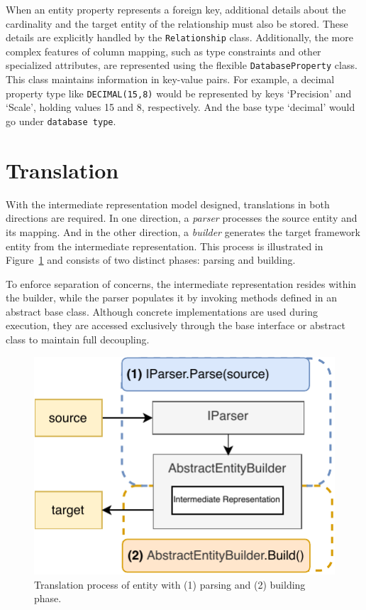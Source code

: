 When an entity property represents a foreign key, additional details about the cardinality and the target entity of the relationship must also be stored. These details are explicitly handled by the \texttt{Relationship} class. Additionally, the more complex features of column mapping, such as type constraints and other specialized attributes, are represented using the flexible \texttt{DatabaseProperty} class. This class maintains information in key-value pairs. For example, a decimal property type like \texttt{DECIMAL(15,8)} would be represented by  keys `Precision' and `Scale', holding values 15 and 8, respectively. And the base type `decimal' would go under \texttt{database type}. 



\section{Translation}

With the intermediate representation model designed, translations in both directions are required. In one direction, a \textit{parser} processes the source entity and its mapping. And in the other direction, a \textit{builder} generates the target framework entity from the intermediate representation. This process is illustrated in Figure~\ref{fig:translation_process} and consists of two distinct phases: parsing and building.

To enforce separation of concerns, the intermediate representation resides within the builder, while the parser populates it by invoking methods defined in an abstract base class. Although concrete implementations are used during execution, they are accessed exclusively through the base interface or abstract class to maintain full decoupling.

\begin{figure}[ht]
  \centering
  \includegraphics[scale=1]{thesis/img/thesis/03_translate_process.drawio.pdf}
  \caption{Translation process of entity with (1) parsing and (2) building phase.}
  \label{fig:translation_process}
\end{figure}


